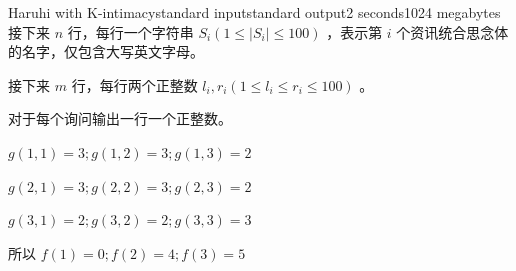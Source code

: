 \begin{problem}{Haruhi with K-intimacy}{standard input}{standard output}{2 seconds}{1024 megabytes}
接下来 $n$ 行，每行一个字符串 $S_i(1 \leq |S_i| \leq 100)$ ，表示第 $i$ 个资讯统合思念体的名字，仅包含大写英文字母。

接下来 $m$ 行，每行两个正整数 $l_i,r_i(1 \leq l_i \leq r_i \leq 100)$ 。

\OutputFile

对于每个询问输出一行一个正整数。

\Example
\begin{example}
%
\end{example}

\Note

$g(1,1)=3;g(1,2)=3;g(1,3)=2$

$g(2,1)=3;g(2,2)=3;g(2,3)=2$

$g(3,1)=2;g(3,2)=2;g(3,3)=3$

所以 $f(1)=0;f(2)=4;f(3)=5$

\end{problem}
